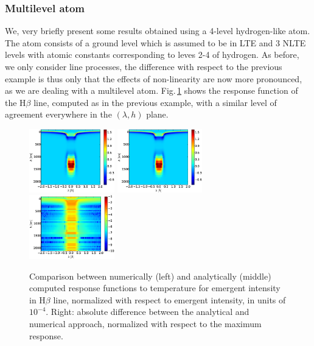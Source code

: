 \documentclass[referee]{aa}
\begin{document}
\subsubsection{Multilevel atom}
We, very briefly present some results obtained using a 4-level hydrogen-like atom. The atom consists of a ground level which is assumed to be in LTE and 3 NLTE levels with atomic constants corresponding to leves 2-4 of hydrogen. As before, we only consider line processes, the difference with respect to the previous example is thus only that the effects of non-linearity are now more pronounced, as we are dealing with a multilevel atom. Fig.\,\ref{example_2} shows the response function of the H$\beta$ line, computed as in the previous example, with a similar level of agreement everywhere in the $(\lambda,h)$ plane.

\begin{figure}
 \includegraphics[width = 0.33\textwidth]{ex_2_numerical_responses_intensity_temperature.eps}
 \includegraphics[width = 0.33\textwidth]{ex_2_analytical_responses_intensity_temperature.eps}
 \includegraphics[width = 0.33\textwidth]{ex_2_relative_difference_responses_intensity_temperature.eps}
 \caption{Comparison between numerically (left) and analytically (middle) computed response functions to temperature for emergent intensity in H$\beta$ line, normalized with respect to emergent intensity, in units of $10^{-4}$. Right: absolute difference between the analytical and numerical approach, normalized with respect to the maximum response.}
 \label{example_2}
\end{figure}
\end{document}
